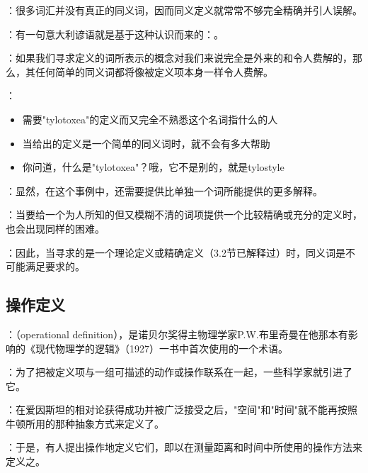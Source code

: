 \begin{theorembox}[title=局限一：真正同义词的稀缺性]
：很多词汇并没有真正的同义词，因而同义定义就常常不够完全精确并引人误解。

：有一句意大利谚语就是基于这种认识而来的：。
\end{theorembox}

\begin{theorembox}[title=局限二：陌生概念的循环困难]
：如果我们寻求定义的词所表示的概念对我们来说完全是外来的和令人费解的，那么，其任何简单的同义词都将像被定义项本身一样令人费解。

：
\begin{itemize}
  \item 需要"tylotoxea"的定义而又完全不熟悉这个名词指什么的人
  \item 当给出的定义是一个简单的同义词时，就不会有多大帮助
  \item 你问道，什么是"tylotoxea"？哦，它不是别的，就是tylostyle
\end{itemize}

：显然，在这个事例中，还需要提供比单独一个词所能提供的更多解释。
\end{theorembox}

\begin{theorembox}[title=局限三：精确定义的需求]
：当要给一个为人所知的但又模糊不清的词项提供一个比较精确或充分的定义时，也会出现同样的困难。

：因此，当寻求的是一个理论定义或精确定义（3.2节已解释过）时，同义词是不可能满足要求的。
\end{theorembox}

\subsection{操作定义}

\begin{theorembox}[title=操作定义的历史起源]
：（operational definition），是诺贝尔奖得主物理学家P.W.布里奇曼在他那本有影响的《现代物理学的逻辑》（1927）一书中首次使用的一个术语。

：为了把被定义项与一组可描述的动作或操作联系在一起，一些科学家就引进了它。
\end{theorembox}

\begin{examplebox}[title=相对论背景下的操作定义]
：在爱因斯坦的相对论获得成功并被广泛接受之后，"空间"和"时间"就不能再按照牛顿所用的那种抽象方式来定义了。

：于是，有人提出操作地定义它们，即以在测量距离和时间中所使用的操作方法来定义之。
\end{examplebox}

